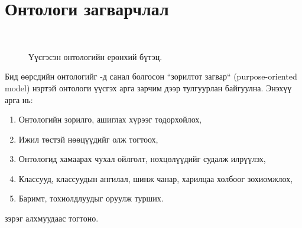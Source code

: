 \documentclass[conference, a4paper, mongolian]{myIEEEtran}
\begin{document}
\section{Онтологи загварчлал}
%
\begin{figure}[t]
	\centering
	 \\
	\hfil
	\caption{Үүсгэсэн онтологийн ерөнхий бүтэц.}
	\label{figure:ontology}
\end{figure}
%
Бид өөрсдийн онтологийг \cite{bib:7}-д санал болгосон ``зорилтот загвар`` (purpose-oriented model) нэртэй онтологи үүсгэх арга зарчим дээр тулгуурлан байгуулна. Энэхүү арга нь:
%
\begin{enumerate}
	\item Онтологийн зорилго, ашиглах хүрээг тодорхойлох,
	\item Ижил төстэй нөөцүүдийг олж тогтоох,
	\item Онтологид хамаарах чухал ойлголт, нөхцөлүүдийг судалж илрүүлэх,
	\item Классууд, классуудын ангилал, шинж чанар, харилцаа холбоог зохиомжлох,
	\item Баримт, тохиолдлуудыг оруулж турших.
\end{enumerate}
зэрэг алхмуудаас тогтоно.
%
\end{document}
